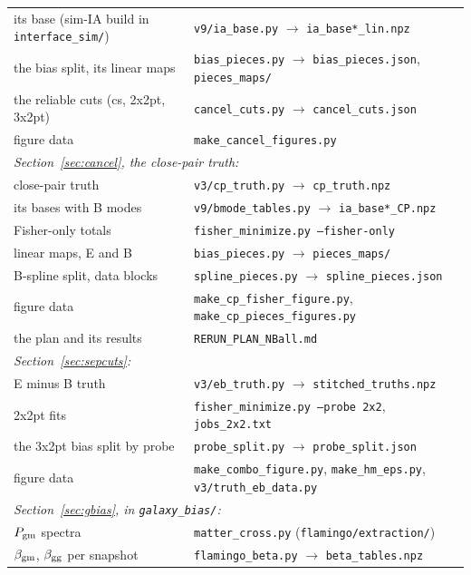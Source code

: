 \documentclass[11pt]{article}
\begin{document}
\begin{center}
\begin{tabular}{ll}
    its base (sim-IA build in \texttt{interface\_sim/}) & \texttt{v9/ia\_base.py} $\rightarrow$ \texttt{ia\_base*\_lin.npz} \\
    the bias split, its linear maps & \texttt{bias\_pieces.py} $\rightarrow$ \texttt{bias\_pieces.json}, \texttt{pieces\_maps/} \\
    the reliable cuts (cs, 2x2pt, 3x2pt) & \texttt{cancel\_cuts.py} $\rightarrow$ \texttt{cancel\_cuts.json} \\
    figure data & \texttt{make\_cancel\_figures.py} \\
    \multicolumn{2}{l}{\textit{Section~\ref{sec:cancel}, the close-pair truth:}} \\
    close-pair truth & \texttt{v3/cp\_truth.py} $\rightarrow$ \texttt{cp\_truth.npz} \\
    its bases with B modes & \texttt{v9/bmode\_tables.py} $\rightarrow$ \texttt{ia\_base*\_CP.npz} \\
    Fisher-only totals & \texttt{fisher\_minimize.py --fisher-only} \\
    linear maps, E and B & \texttt{bias\_pieces.py} $\rightarrow$ \texttt{pieces\_maps/} \\
    B-spline split, data blocks & \texttt{spline\_pieces.py} $\rightarrow$ \texttt{spline\_pieces.json} \\
    figure data & \texttt{make\_cp\_fisher\_figure.py}, \texttt{make\_cp\_pieces\_figures.py} \\
    the plan and its results & \texttt{RERUN\_PLAN\_NBall.md} \\
    \multicolumn{2}{l}{\textit{Section~\ref{sec:sepcuts}:}} \\
    E minus B truth & \texttt{v3/eb\_truth.py} $\rightarrow$ \texttt{stitched\_truths.npz} \\
    2x2pt fits & \texttt{fisher\_minimize.py --probe 2x2}, \texttt{jobs\_2x2.txt} \\
    the 3x2pt bias split by probe & \texttt{probe\_split.py} $\rightarrow$ \texttt{probe\_split.json} \\
    figure data & \texttt{make\_combo\_figure.py}, \texttt{make\_hm\_eps.py}, \texttt{v3/truth\_eb\_data.py} \\
    \multicolumn{2}{l}{\textit{Section~\ref{sec:gbias}, in \texttt{galaxy\_bias/}:}} \\
    $P_{\rm gm}$ spectra & \texttt{matter\_cross.py} (\texttt{flamingo/extraction/}) \\
    $\beta_{\rm gm}$, $\beta_{\rm gg}$ per snapshot & \texttt{flamingo\_beta.py} $\rightarrow$ \texttt{beta\_tables.npz} \\

\end{tabular}
\end{center}
\end{document}
